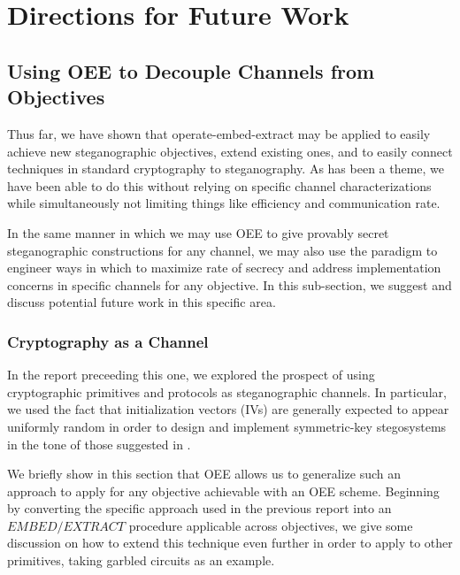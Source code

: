 \documentclass{article}
\begin{document}
\section{Directions for Future Work}

\subsection{Using OEE to Decouple Channels from Objectives}

Thus far, we have shown that operate-embed-extract may be applied to easily 
achieve new steganographic objectives, extend existing ones, and to easily connect techniques in standard 
cryptography to steganography.  As has been a theme, we have been able to do this without 
relying on specific channel characterizations while simultaneously not limiting things like efficiency 
and communication rate.

In the same manner in which we may use OEE to give provably secret steganographic constructions for any channel, 
we may also use the paradigm to engineer ways in which to maximize rate of secrecy and address implementation 
concerns in specific channels for any objective.  In this sub-section, we 
suggest and discuss potential future work in this specific area.

\subsubsection{Cryptography as a Channel}

In the report preceeding this one, we explored the prospect of using cryptographic primitives and protocols as steganographic channels.  In particular, we used the fact that initialization vectors (IVs) are generally expected to appear uniformly random 
in order to design and implement symmetric-key stegosystems in the tone of those 
suggested in \cite{BiglouPSS}.

We briefly show in this section that OEE allows us to generalize such an approach 
to apply for any objective achievable with an OEE scheme.  Beginning by 
converting the specific approach used in the previous report into an $EMBED/EXTRACT$
procedure applicable across objectives, we give some discussion on how to extend
this technique even further in order to apply to other primitives, taking 
garbled circuits as an example.
\end{document}
